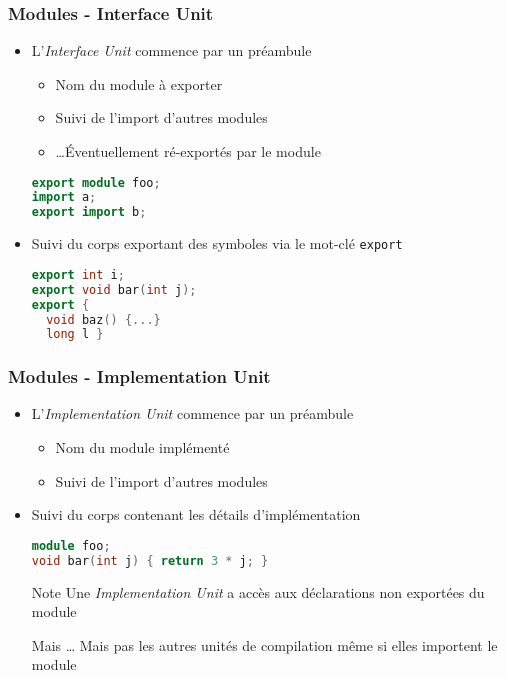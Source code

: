 \documentclass[C++.tex]{subfiles}
\begin{document}
\begin{frame}[fragile]
	\frametitle{Modules - Interface Unit}
	\begin{itemize}
		\item L'\textit{Interface Unit} commence par un préambule
		\begin{itemize}
			\item Nom du module à exporter
			\item Suivi de l'import d'autres modules
			\item \ldots Éventuellement ré-exportés par le module
		\end{itemize}

		\begin{lstlisting}[language=C++]
export module foo;
import a;
export import b;\end{lstlisting}

		\item Suivi du corps exportant des symboles via le mot-clé \lstinline|export|

		\begin{lstlisting}[language=C++]
export int i;
export void bar(int j);
export {
  void baz() {...}
  long l }\end{lstlisting}
	\end{itemize}
\end{frame}

\begin{frame}[fragile]
	\frametitle{Modules - Implementation Unit}
	\begin{itemize}
		\item L'\textit{Implementation Unit} commence par un préambule
		\begin{itemize}
			\item Nom du module implémenté
			\item Suivi de l'import d'autres modules
		\end{itemize}

		\item Suivi du corps contenant les détails d'implémentation

		\begin{lstlisting}[language=C++]
module foo;
void bar(int j) { return 3 * j; }\end{lstlisting}

		\begin{block}{Note}
			Une \textit{Implementation Unit} a accès aux déclarations non exportées du module

		\end{block}
	
\pause
	
		\begin{alertblock}{Mais \ldots}
			Mais pas les autres unités de compilation même si elles importent le module
		\end{alertblock}
	\end{itemize}
\end{frame}
\end{document}
